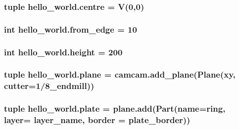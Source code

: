 \subsubsection[{centre}]{\setlength{\rightskip}{0pt plus 5cm}tuple hello\+\_\+world.\+centre = V(0,0)}\label{namespacehello__world_ae63f17007209859fdd46882dd44e6c91}
\hypertarget{namespacehello__world_ac1073c6a94e45d98f07b6271f6fa5e97}{}
\subsubsection[{from\+\_\+edge}]{\setlength{\rightskip}{0pt plus 5cm}int hello\+\_\+world.\+from\+\_\+edge = 10}\label{namespacehello__world_ac1073c6a94e45d98f07b6271f6fa5e97}
\hypertarget{namespacehello__world_aa435c61049b7ab873412b09bb73d043f}{}
\subsubsection[{height}]{\setlength{\rightskip}{0pt plus 5cm}int hello\+\_\+world.\+height = 200}\label{namespacehello__world_aa435c61049b7ab873412b09bb73d043f}
\hypertarget{namespacehello__world_ad9d0a598115e85f261abd4d004c02cb5}{}
\subsubsection[{plane}]{\setlength{\rightskip}{0pt plus 5cm}tuple hello\+\_\+world.\+plane = camcam.\+add\+\_\+plane(Plane(\textquotesingle{}xy\textquotesingle{}, cutter=\textquotesingle{}1/8\+\_\+endmill\textquotesingle{}))}\label{namespacehello__world_ad9d0a598115e85f261abd4d004c02cb5}
\hypertarget{namespacehello__world_a910fd85f0bafe7016c9ee6dd634d93fa}{}
\subsubsection[{plate}]{\setlength{\rightskip}{0pt plus 5cm}tuple hello\+\_\+world.\+plate = plane.\+add(Part(name=\textquotesingle{}ring\textquotesingle{}, layer= \textquotesingle{}layer\+\_\+name\textquotesingle{}, border = {\bf plate\+\_\+border}))}\label{namespacehello__world_a910fd85f0bafe7016c9ee6dd634d93fa}
\hypertarget{namespacehello__world_aae96ddc88251a81fdf48adb9742a0446}{}
